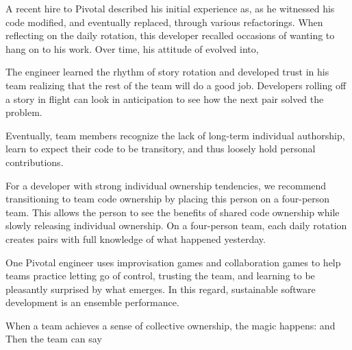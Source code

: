 A recent hire to Pivotal described his initial experience as,  as he witnessed his code modified, and eventually replaced, through various refactorings. When reflecting on the daily rotation, this developer recalled occasions of wanting to hang on to his work.  Over time, his attitude of  evolved into,  

The engineer learned the rhythm of story rotation and developed trust in his team realizing that the rest of the team will do a good job. Developers rolling off a story in flight can look in anticipation to see how the next pair solved the problem. 

Eventually, team members recognize the lack of long-term individual authorship, learn to expect their code to be transitory, and thus loosely hold personal contributions.   

For a developer with strong individual ownership tendencies, we recommend transitioning to team code ownership by placing this person on a four-person team. This allows the person to see the benefits of shared code ownership while slowly releasing individual ownership. On a four-person team, each daily rotation creates pairs with full knowledge of what happened yesterday.  


One Pivotal engineer uses improvisation games and collaboration games to help teams practice letting go of control, trusting the team, and learning to be pleasantly surprised by what emerges. In this regard, sustainable software development is an ensemble performance. 

When a team achieves a sense of collective ownership, the magic happens:  and  Then the team can say 

